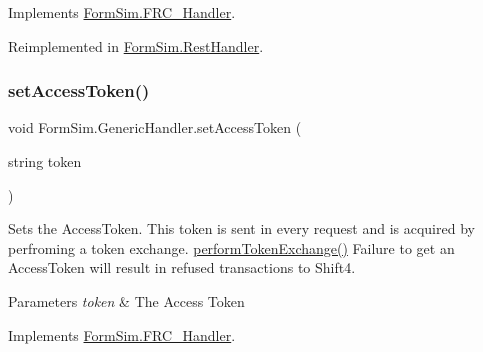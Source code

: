 Implements \mbox{\hyperlink{interface_form_sim_1_1_f_r_c___handler_ad4b9146b6142d1d6ded15e5de4ed4675}{Form\+Sim.\+F\+R\+C\+\_\+\+Handler}}.



Reimplemented in \mbox{\hyperlink{class_form_sim_1_1_rest_handler_a4a777189e9e16dc9970fe8f2557555db}{Form\+Sim.\+Rest\+Handler}}.

\mbox{\label{class_form_sim_1_1_generic_handler_ac2fe26607f27b8009b3d744bee7ba794}} 
\subsubsection{\texorpdfstring{set\+Access\+Token()}{setAccessToken()}}
{\footnotesize\ttfamily void Form\+Sim.\+Generic\+Handler.\+set\+Access\+Token (\begin{DoxyParamCaption}\item[{string}]{token }\end{DoxyParamCaption})\hspace{0.3cm}{\ttfamily [inline]}}



Sets the Access\+Token. This token is sent in every request and is acquired by perfroming a token exchange. \mbox{\hyperlink{class_form_sim_1_1_generic_handler_a731bd7dada7e2d13fd9c9d768bd387ee}{perform\+Token\+Exchange()}} Failure to get an Access\+Token will result in refused transactions to Shift4. 


\begin{DoxyParams}{Parameters}
{\em token} & The Access Token\\
\hline
\end{DoxyParams}


Implements \mbox{\hyperlink{interface_form_sim_1_1_f_r_c___handler_a6a11b11aaf8b033b87de9fddaf2d325e}{Form\+Sim.\+F\+R\+C\+\_\+\+Handler}}.

\mbox{\label{class_form_sim_1_1_generic_handler_a905d080f02134e993d7afbb1dcc8f44b}} 
